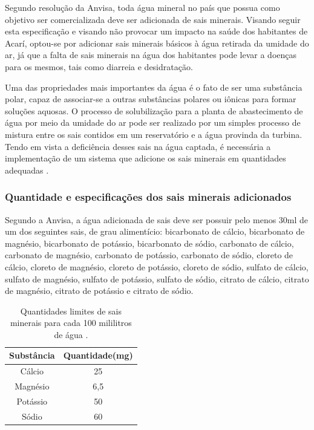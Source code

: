 Segundo resolução da Anvisa, toda água mineral no país que possua como objetivo ser comercializada deve ser adicionada
de sais minerais. Visando seguir esta especificação e visando não provocar um impacto na saúde dos habitantes de Acarí,
optou-se por adicionar sais minerais básicos à água retirada da umidade do ar, já que a falta de sais minerais na água 
dos habitantes pode levar a doenças para os mesmos, tais como diarreia e desidratação.

Uma das propriedades mais importantes da água é o fato de ser uma substância polar, capaz de associar-se a outras substâncias
polares ou iônicas para formar soluções aquosas. O processo de solubilização para a planta de abastecimento de água por meio 
da umidade do ar pode ser realizado por um simples processo de mistura entre os sais contidos em um reservatório e a água
provinda da turbina. Tendo em vista a deficiência desses sais na água captada, é necessária a implementação de um sistema
que adicione os sais minerais em quantidades adequadas \cite{christine08}.

\subsubsection{Quantidade e especificações dos sais minerais adicionados}

  Segundo a Anvisa, a água adicionada de sais  deve ser possuir pelo menos 30ml de um dos seguintes sais, de grau alimentício:
  bicarbonato de cálcio, bicarbonato de magnésio, bicarbonato de potássio, bicarbonato de sódio, carbonato de cálcio, carbonato
  de magnésio, carbonato de potássio, carbonato de sódio, cloreto de cálcio, cloreto de magnésio, cloreto de potássio, cloreto
  de sódio, sulfato de cálcio, sulfato de magnésio, sulfato de potássio, sulfato de sódio, citrato de cálcio, citrato de magnésio,
  citrato de potássio e citrato de sódio.
  
  \begin{table}[h]
    \centering
    \begin{tabular}{|c|c|}
    
    \hline
    Substância & Quantidade(mg)\\
    \hline                               
    Cálcio & 25\\
    \hline                               
    Magnésio & 6,5\\
    \hline                               
    Potássio & 50\\
    \hline                               
    Sódio & 60\\
    \hline
    \end{tabular}
    \caption{Quantidades limites de sais minerais para cada 100 mililitros de água \cite{anvisa05}.}
  \end{table}

